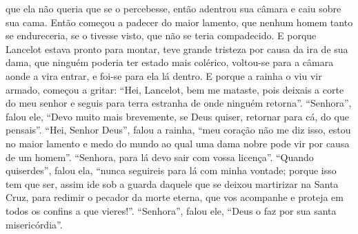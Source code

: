 que ela não queria que se o percebesse, então adentrou sua câmara e caiu sobre
sua cama. Então começou a padecer do maior lamento, que nenhum homem tanto se
endureceria, se o tivesse visto, que não se teria compadecido. E porque
Lancelot estava pronto para montar, teve grande tristeza por causa da ira de
sua dama, que ninguém poderia ter estado mais colérico, voltou-se para a câmara
aonde a vira entrar, e foi-se para ela lá dentro. E porque a rainha o viu vir
armado, começou a gritar: “Hei, Lancelot, bem me mataste, pois deixais a corte
do meu senhor e seguis para terra estranha de onde ninguém retorna”. “Senhora”,
falou ele, “Devo muito mais brevemente, se Deus quiser, retornar para cá, do
que pensais”. “Hei, Senhor Deus”, falou a rainha, “meu coração não me diz isso,
estou no maior lamento e medo do mundo ao qual uma dama nobre pode vir por
causa de um homem”. “Senhora, para lá devo sair com vossa licença”. “Quando
quiserdes”, falou ela, “nunca seguireis para lá com minha vontade; porque isso
tem que ser, assim ide sob a guarda daquele que se deixou martirizar na Santa
Cruz, para redimir o pecador da morte eterna, que vos acompanhe e proteja em
todos os confins a que vieres!”. “Senhora”, falou ele, “Deus o faz por sua
santa misericórdia”. 

